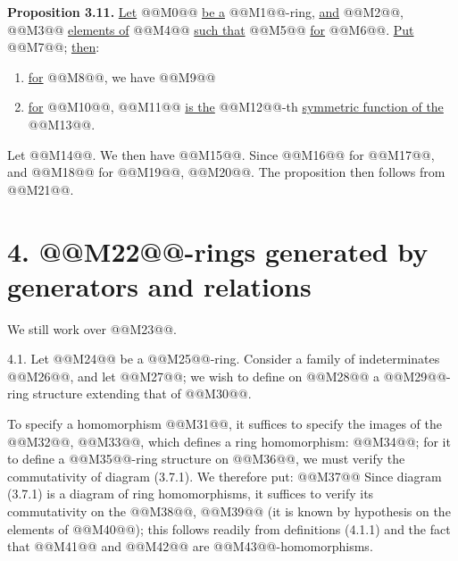\textbf{Proposition 3.11.} \uline{Let} @@M0@@ \uline{be a} @@M1@@-ring, \uline{and} @@M2@@, @@M3@@ \uline{elements of} @@M4@@ \uline{such that} @@M5@@ \uline{for} @@M6@@. \uline{Put} @@M7@@; \uline{then}:
\begin{enumerate}[label=\roman*)]
\item \uline{for} @@M8@@, we have @@M9@@
\item \uline{for} @@M10@@, @@M11@@ \uline{is the} @@M12@@-th \uline{symmetric function of the} @@M13@@.
\end{enumerate}
Let @@M14@@. We then have @@M15@@. Since @@M16@@ for @@M17@@, and @@M18@@ for @@M19@@, @@M20@@. The proposition then follows from @@M21@@.

\section*{4. @@M22@@-rings generated by generators and relations}

We still work over @@M23@@.

4.1. Let @@M24@@ be a @@M25@@-ring. Consider a family of indeterminates @@M26@@, and let @@M27@@; we wish to define on @@M28@@ a @@M29@@-ring structure extending that of @@M30@@.

To specify a homomorphism @@M31@@, it suffices to specify the images of the @@M32@@, @@M33@@, which defines a ring homomorphism: @@M34@@; for it to define a @@M35@@-ring structure on @@M36@@, we must verify the commutativity of diagram (3.7.1). We therefore put:
@@M37@@
Since diagram (3.7.1) is a diagram of ring homomorphisms, it suffices to verify its commutativity on the @@M38@@, @@M39@@ (it is known by hypothesis on the elements of @@M40@@); this follows readily from definitions (4.1.1) and the fact that @@M41@@ and @@M42@@ are @@M43@@-homomorphisms.

